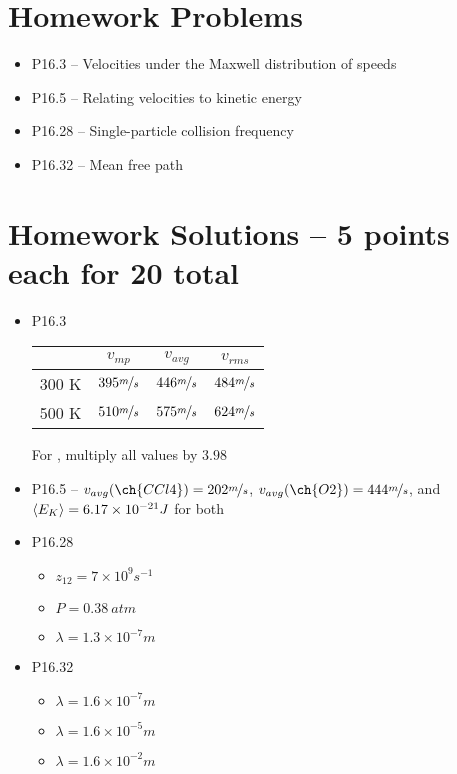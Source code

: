 \documentclass[12pt, openany, letterpaper]{memoir}
\begin{document}
\section*{Homework Problems}
\begin{itemize}
	\item P16.3 -- Velocities under the Maxwell distribution of speeds
	\item P16.5 -- Relating velocities to kinetic energy
	\item P16.28 -- Single-particle collision frequency
	\item P16.32 -- Mean free path
\end{itemize}
\section*{Homework Solutions -- 5 points each for 20 total}
\begin{itemize}
	\item P16.3
	
	\begin{tabular}{cccc}
		& $v_{mp}$ & $v_{avg}$ & $v_{rms}$\\ \midrule
		300 K & $395\nicefrac{m}{s}$ & $446\nicefrac{m}{s}$ & $484\nicefrac{m}{s}$ \\
		500 K & $510\nicefrac{m}{s}$ & $575\nicefrac{m}{s}$ & $624\nicefrac{m}{s}$ \\
	\end{tabular}
	
	For , multiply all  values by $3.98$
	\item P16.5 -- $v_{avg}(\ch{CCl4}) = 202 \nicefrac{m}{s}$, $v_{avg}(\ch{O2}) = 444 \nicefrac{m}{s}$, and $\left< E_K \right>=6.17\times 10^{-21}J$ for both
	\item P16.28
	\begin{itemize}
		\item $z_{12} = 7\times10^9 s^{-1}$
		\item $P=0.38~atm$
		\item $\lambda = 1.3\times10^{-7}m$
	\end{itemize}
	\item P16.32
	\begin{itemize}
		\item $\lambda = 1.6\times10^{-7}m$
		\item $\lambda = 1.6\times10^{-5}m$
		\item $\lambda = 1.6\times10^{-2}m$
	\end{itemize}
\end{itemize}
\end{document}

